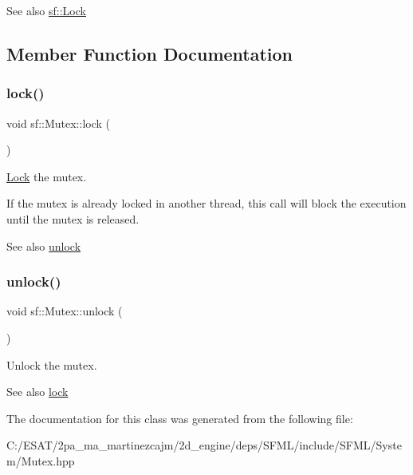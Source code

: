 \begin{DoxySeeAlso}{See also}
\hyperlink{classsf_1_1_lock}{sf\+::\+Lock} 
\end{DoxySeeAlso}


\subsection{Member Function Documentation}
\mbox{\label{classsf_1_1_mutex_a1a16956a6bbea764480c1b80f2e45763}} 
\subsubsection{\texorpdfstring{lock()}{lock()}}
{\footnotesize\ttfamily void sf\+::\+Mutex\+::lock (\begin{DoxyParamCaption}{ }\end{DoxyParamCaption})}



\hyperlink{classsf_1_1_lock}{Lock} the mutex. 

If the mutex is already locked in another thread, this call will block the execution until the mutex is released.

\begin{DoxySeeAlso}{See also}
\hyperlink{classsf_1_1_mutex_ade71268ffc5e80756652058b01c23c33}{unlock} 
\end{DoxySeeAlso}
\mbox{\label{classsf_1_1_mutex_ade71268ffc5e80756652058b01c23c33}} 
\subsubsection{\texorpdfstring{unlock()}{unlock()}}
{\footnotesize\ttfamily void sf\+::\+Mutex\+::unlock (\begin{DoxyParamCaption}{ }\end{DoxyParamCaption})}



Unlock the mutex. 

\begin{DoxySeeAlso}{See also}
\hyperlink{classsf_1_1_mutex_a1a16956a6bbea764480c1b80f2e45763}{lock} 
\end{DoxySeeAlso}


The documentation for this class was generated from the following file\+:\begin{DoxyCompactItemize}
\item 
C\+:/\+E\+S\+A\+T/2pa\+\_\+ma\+\_\+martinezcajm/2d\+\_\+engine/deps/\+S\+F\+M\+L/include/\+S\+F\+M\+L/\+System/Mutex.\+hpp\end{DoxyCompactItemize}
